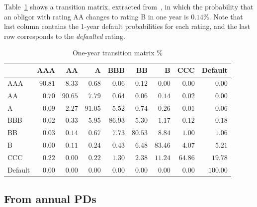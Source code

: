 \documentclass[11pt,fleqn]{book} %
\begin{document}
\begin{example}
	\label{ex:1ytm}
	Table~\ref{tmatrix1} shows a transition matrix, extracted 
	from~\cite[p. 20]{cmetrics:1997}, in which the probability that an obligor 
	with rating AA changes to rating B in one year is $0.14\%$. Note that 
	last column contains the 1-year default probabilities for each rating, and 
	the last row corresponds to the \emph{defaulted} rating.
	\begin{table}[!ht]
		\begin{center}
			\begin{tabular}[]{l|rrrrrrrr}
				        & AAA     & AA      & A       & BBB     & BB      & B                  & CCC     & Default  \\
				\hline
				AAA     & $90.81$ & $8.33$  & $0.68$  & $0.06$  & $0.12$  & $0.00$             & $0.00$  & $0.00$   \\
				AA      & $0.70$  & $90.65$ & $7.79$  & $0.64$  & $0.06$  & $\underline{0.14}$ & $0.02$  & $0.00$   \\
				A       & $0.09$  & $2.27$  & $91.05$ & $5.52$  & $0.74$  & $0.26$             & $0.01$  & $0.06$   \\
				BBB     & $0.02$  & $0.33$  & $5.95$  & $86.93$ & $5.30$  & $1.17$             & $0.12$  & $0.18$   \\
				BB      & $0.03$  & $0.14$  & $0.67$  & $7.73$  & $80.53$ & $8.84$             & $1.00$  & $1.06$   \\
				B       & $0.00$  & $0.11$  & $0.24$  & $0.43$  & $6.48$  & $83.46$            & $4.07$  & $5.21$   \\
				CCC     & $0.22$  & $0.00$  & $0.22$  & $1.30$  & $2.38$  & $11.24$            & $64.86$ & $19.78$  \\
				Default & $0.00$  & $0.00$  & $0.00$  & $0.00$  & $0.00$  & $0.00$             & $0.00$  & $100.00$ \\
			\end{tabular}
			\caption{One-year transition matrix \%}
			\label{tmatrix1}
		\end{center}
	\end{table}
\end{example}

\subsection{From annual PDs}
\label{pdfsv}
\end{document}
